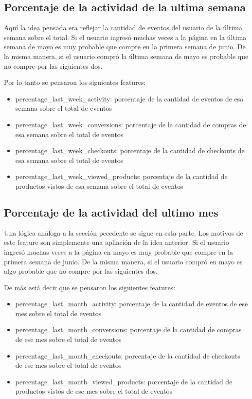 \documentclass[a4paper]{article}
\begin{document}
\subsection{Porcentaje de la actividad de la ultima semana}

Aquí la idea pensada era reflejar la cantidad de eventos del usuario de la última semana sobre el total. Si el usuario ingresó muchas veces a la página en la última semana de mayo es muy probable que compre en la primera semana de junio. De la misma manera, si el usuario compró la última semana de mayo es probable que no compre por las siguientes dos.

Por lo tanto se pensaron los siguientes features:

\begin{itemize}
	\item percentage\_last\_week\_activity: porcentaje de la cantidad de eventos de esa semana sobre el total de eventos
	\item percentage\_last\_week\_conversions:  porcentaje de la cantidad de compras de esa semana sobre el total de eventos
	\item percentage\_last\_week\_checkouts: porcentaje de la cantidad de checkouts de esa semana sobre el total de eventos
	\item percentage\_last\_week\_viewed\_products: porcentaje de la cantidad de productos vistos de esa semana sobre el total de eventos
\end{itemize}


\subsection{Porcentaje de la actividad del ultimo mes}
Una lógica análoga a la sección pecedente se sigue en esta parte. Los motivos de este feature son simplemente una apliación de la idea anterior. Si el usuario ingresó muchas veces a la página en mayo es muy probable que compre en la primera semana de junio. De la misma manera, si el usuario compró en mayo es algo probable que no compre por las siguientes dos.

De más está decir que se pensaron los siguientes features:
\begin{itemize}
	\item percentage\_last\_month\_activity: porcentaje de la cantidad de eventos de ese mes sobre el total de eventos
	\item percentage\_last\_month\_conversions:  porcentaje de la cantidad de compras de ese mes sobre el total de eventos
	\item percentage\_last\_month\_checkouts: porcentaje de la cantidad de checkouts de ese mes sobre el total de eventos
	\item percentage\_last\_month\_viewed\_products: porcentaje de la cantidad de productos vistos de ese mes sobre el total de eventos
\end{itemize}
\end{document}
